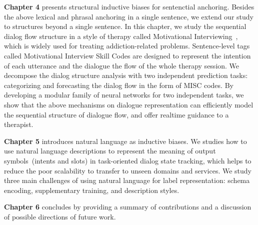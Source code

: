 \textbf{Chapter 4} presents structural inductive biases for
sentenctial anchoring. Besides the above lexical and phrasal anchoring
in a single sentence, we extend our study to structures beyond a
single sentence. In this chapter, we study the sequential dialog flow
structure in a style of therapy called Motivational
Interviewing~\cite[MI,][]{miller2003motivational,miller2012motivational},
which is widely used for treating addiction-related problems.
Sentence-level tags called Motivational Interview Skill Codes are
designed to represent the intention of each utterance and the dialogue
the flow of the whole therapy session. We decompose the dialog
structure analysis with two independent prediction tasks: categorizing
and forecasting the dialog flow in the form of MISC codes. By
developing a modular family of neural networks for two independent
tasks, we show that the above mechanisms on dialogue representation
can efficiently model the sequential structure of dialogue flow, and
offer realtime guidance to a therapist.

\textbf{Chapter 5} introduces natural language as inductive biases. We
studies how to use natural language descriptions to represent the
meaning of output symbols~(intents and slots) in task-oriented dialog
state tracking, which helps to reduce the poor scalability to transfer
to unseen domains and services. We study three main challenges of
using natural language for label representation: schema encoding,
supplementary training, and description styles.


\textbf{Chapter 6} concludes by providing a summary of contributions
and a discussion of possible directions of future work.

